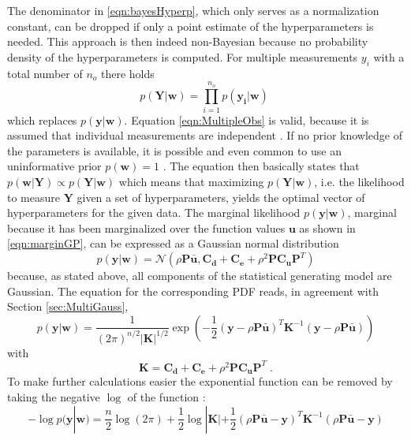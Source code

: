 \documentclass[%
  a4paper,oneside,%
  11pt,%
  smallchapters,
  style=printdev,
  extramargin,
  green,%
  rgb, <cmyk>
  ]{tubsbook}
\begin{document}
The denominator in \ref{eqn:bayesHyperp}, which only serves as a normalization constant, can be dropped if only a point estimate of the hyperparameters is needed. This approach is then indeed non-Bayesian because no probability density of the hyperparameters is computed.
For multiple measurements $y_i$ with a total number of $n_o$ there holds
\begin{equation}
p(\bm{Y}|\bm{w}) = \prod_{i=1}^{n_o} p(\bm{y_i}|\bm{w}) \; 
\label{eqn:MultipleObs}
\end{equation}
which replaces $p(\bm{y}|\bm{w})$.
Equation \eqref{eqn:MultipleObs} is valid, because it is assumed that individual measurements are independent \cite[p.9]{rasmussen2006}.
If no prior knowledge of the parameters is available, it is possible and even common to use an uninformative prior $p(\bm{w}) = 1$ \cite[p.433]{kennedy2001}. 
The equation then basically states that $p(\bm{w}|\bm{Y}) \propto p(\bm{Y}|\bm{w})$ which means that maximizing  $p(\bm{Y}|\bm{w})$, i.e. the likelihood to measure $\bm{Y}$ given a set of hyperparameters, yields the optimal vector of hyperparameters for the given data. 
The marginal likelihood $p(\bm{y}|\bm{w})$, marginal because it has been marginalized over the function values $\bm{u}$ as shown in \eqref{eqn:marginGP}, can be expressed as a Gaussian normal distribution
\begin{equation}
p(\bm{y}|\bm{w}) = \mathcal{N}(\rho \bm{P}\bar{\bm{u}}, \bm{C_d}+\bm{C_e} + \rho^2 \bm{P} \bm{C_u} \bm{P}^T)
\end{equation}
because, as stated above, all components of the statistical generating model are Gaussian.
The equation for the corresponding PDF reads, in agreement with Section \ref{sec:MultiGauss},
\begin{equation}
p(\bm{y}|\bm{w}) = \frac{1}{(2 \pi)^{n/2} |\bm{K}|^{1/2} } \exp \left(   -\frac{1}{2} (\bm{y} - \rho \bm{P}\bar{\bm{u}})^T \bm{K}^{-1} (\bm{y} - \rho \bm{P}\bar{\bm{u}})   \right)
\end{equation}
with
\begin{equation}
\bm{K} = \bm{C_d}+\bm{C_e} + \rho^2 \bm{P} \bm{C_u} \bm{P}^T \; .
\end{equation}
%
To make further calculations easier the exponential function can be removed by taking the negative $\log$ of the function \cite[p.113]{rasmussen2006}:
\begin{equation}
- \log p(\bm{y}|\bm{w}) = \frac{n}{2} \log(2 \pi) + \frac{1}{2} \log |\bm{K}| + \frac{1}{2}(\rho \bm{P}\bar{\bm{u}} - \bm{y})^T \bm{K}^{-1} (\rho \bm{P}\bar{\bm{u}} - \bm{y}) 
\label{eqn:neglog}
\end{equation}
\end{document}
